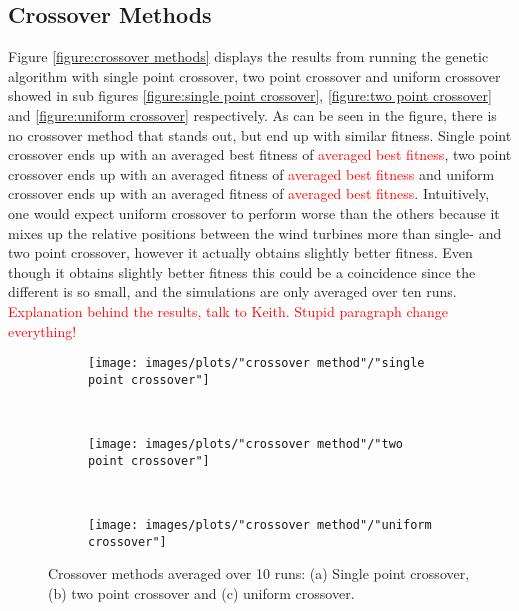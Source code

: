 \subsection{Crossover Methods}
Figure \ref{figure:crossover methods} displays the results from running the genetic algorithm with single point crossover, two point crossover and uniform crossover showed in sub figures \ref{figure:single point crossover}, \ref{figure:two point crossover} and \ref{figure:uniform crossover} respectively. As can be seen in the figure, there is no crossover method that stands out, but end up with similar fitness. Single point crossover ends up with an averaged best fitness of \textcolor{red}{averaged best fitness}, two point crossover ends up with an averaged fitness of \textcolor{red}{averaged best fitness} and uniform crossover ends up with an averaged fitness of \textcolor{red}{averaged best fitness}. Intuitively, one would expect uniform crossover to perform worse than the others because it mixes up the relative positions between the wind turbines more than single- and two point crossover, however it actually obtains slightly better fitness. Even though it obtains slightly better fitness this could be a coincidence since the different is so small, and the simulations are only averaged over ten runs. \textcolor{red}{Explanation behind the results, talk to Keith. Stupid paragraph change everything!}


\begin{figure}[h!]
    \centering
    \begin{subfigure}[b]{0.31\textwidth}
        \texttt{[image: images/plots/"crossover method"/"single point crossover"]}
        \caption{}
        \hfill
        \label{plot:single point crossover}
    \end{subfigure}
    ~
    \begin{subfigure}[b]{0.31\textwidth}
        \texttt{[image: images/plots/"crossover method"/"two point crossover"]}
        \caption{}
        \hfill
        \label{plot:two point crossover}
    \end{subfigure}
    ~
    \begin{subfigure}[b]{0.31\textwidth}
        \texttt{[image: images/plots/"crossover method"/"uniform crossover"]}
        \caption{}
        \hfill
        \label{plot:uniform crossover}
    \end{subfigure}
    \caption{Crossover methods averaged over 10 runs: (a) Single point crossover, (b) two point crossover and (c) uniform crossover.}
    \label{plot:crossover methods}
\end{figure}


